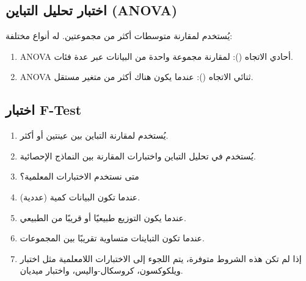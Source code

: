 \subsection{اختبار تحليل التباين (ANOVA)}
يُستخدم لمقارنة متوسطات أكثر من مجموعتين.
له أنواع مختلفة: 
\begin{enumerate}
\item  	ANOVA أحادي الاتجاه (): لمقارنة مجموعة واحدة من البيانات عبر عدة فئات.
\item  	ANOVA ثنائي الاتجاه (): عندما يكون هناك أكثر من متغير مستقل.
\end{enumerate}

\subsection{اختبار F-Test}
\begin{enumerate}[label=$\bullet$]
\item  	يُستخدم لمقارنة التباين بين عينتين أو أكثر.
\item  	يُستخدم في تحليل التباين واختبارات المقارنة بين النماذج الإحصائية.
\item 	متى نستخدم الاختبارات المعلمية؟
\item  	عندما تكون البيانات كمية (عددية).
\item  	عندما يكون التوزيع طبيعيًا أو قريبًا من الطبيعي.
\item 	عندما تكون التباينات متساوية تقريبًا بين المجموعات.
\item  	إذا لم تكن هذه الشروط متوفرة، يتم اللجوء إلى الاختبارات اللامعلمية مثل اختبار ويلكوكسون، كروسكال-واليس، واختبار ميديان.
\end{enumerate}
